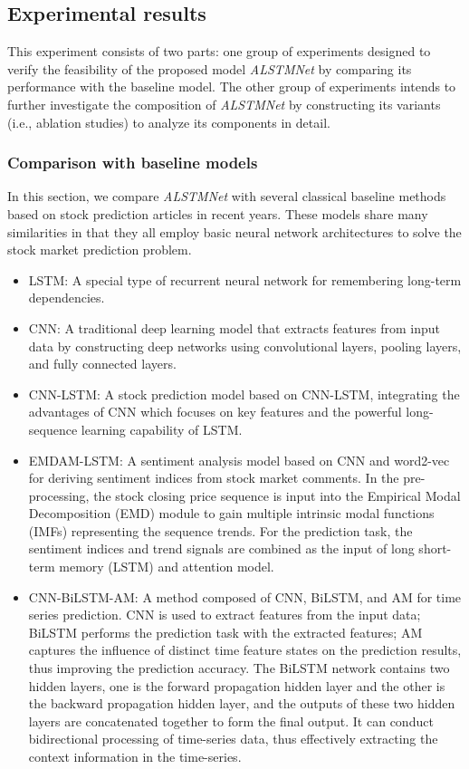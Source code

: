 \documentclass[sn-mathphys]{sn-jnl}%
\theoremstyle{thmstyleone}%
\theoremstyle{thmstyletwo}%
\theoremstyle{thmstylethree}%
\begin{document}
\subsection{Experimental results}\label{Experimental results}
This experiment consists of two parts: one group of experiments designed to verify the feasibility of the proposed model {\it ALSTMNet} by comparing its performance with the baseline model. The other group of experiments intends to further investigate the composition of {\it ALSTMNet} by constructing its variants (i.e., ablation studies) to analyze its components in detail.

\subsubsection{Comparison with baseline models}\label{Comparison with baseline models}
In this section, we compare {\it ALSTMNet} with several classical baseline methods based on stock prediction articles in recent years. These models share many similarities in that they all employ basic neural network architectures to solve the stock market prediction problem.

\begin{itemize}
	\item LSTM: A special type of recurrent neural network for remembering long-term dependencies\cite{RN180}.
	\item CNN: A traditional deep learning model that extracts features from input data by constructing deep networks using convolutional layers, pooling layers, and fully connected layers\cite{RN197}.
	\item CNN-LSTM: A stock prediction model based on CNN-LSTM, integrating the advantages of CNN which focuses on key features and the powerful long-sequence learning capability of LSTM\cite{RN181}.
	\item EMDAM-LSTM: A sentiment analysis model based on CNN and word2-vec for deriving sentiment indices from stock market comments. In the pre-processing, the stock closing price sequence is input into the Empirical Modal Decomposition (EMD) module to gain multiple intrinsic modal functions (IMFs) representing the sequence trends. For the prediction task, the sentiment indices and trend signals are combined as the input of long short-term memory (LSTM) and attention model\cite{RN200}.
	\item CNN-BiLSTM-AM: A method composed of CNN, BiLSTM, and AM for time series prediction. CNN is used to extract features from the input data; BiLSTM performs the prediction task with the extracted features; AM captures the influence of distinct time feature states on the prediction results, thus improving the prediction accuracy. The BiLSTM network contains two hidden layers, one is the forward propagation hidden layer and the other is the backward propagation hidden layer, and the outputs of these two hidden layers are concatenated together to form the final output. It can conduct bidirectional processing of time-series data, thus effectively extracting the context information in the time-series\cite{RN198}.
\end{itemize}
\end{document}
